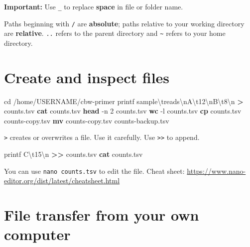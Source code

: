 \documentclass[
]{book}
\newenvironment{Shaded}{\begin{snugshade}}{\end{snugshade}}
\newcommand{\AttributeTok}[1]{\textcolor[rgb]{0.13,0.29,0.53}{#1}}
\newcommand{\BuiltInTok}[1]{#1}
\newcommand{\FunctionTok}[1]{\textcolor[rgb]{0.13,0.29,0.53}{\textbf{#1}}}
\newcommand{\NormalTok}[1]{#1}
\newcommand{\OperatorTok}[1]{\textcolor[rgb]{0.81,0.36,0.00}{\textbf{#1}}}
\newcommand{\StringTok}[1]{\textcolor[rgb]{0.31,0.60,0.02}{#1}}
\begin{document}
\textbf{Important:} Use \texttt{\_} to replace \textbf{space} in file or folder name.

Paths beginning with \texttt{/} are \textbf{absolute}; paths relative to your working directory are \textbf{relative}. \texttt{..} refers to the parent directory and \texttt{\textasciitilde{}} refers to your home directory.

\section{Create and inspect files}\label{create-and-inspect-files}

\begin{Shaded}
\begin{Highlighting}[]
\BuiltInTok{cd}\NormalTok{ /home/USERNAME/cbw{-}primer}
\BuiltInTok{printf} \StringTok{\textquotesingle{}sample\textbackslash{}treads\textbackslash{}nA\textbackslash{}t12\textbackslash{}nB\textbackslash{}t8\textbackslash{}n\textquotesingle{}} \OperatorTok{\textgreater{}}\NormalTok{ counts.tsv}
\FunctionTok{cat}\NormalTok{ counts.tsv}
\FunctionTok{head} \AttributeTok{{-}n}\NormalTok{ 2 counts.tsv}
\FunctionTok{wc} \AttributeTok{{-}l}\NormalTok{ counts.tsv}
\FunctionTok{cp}\NormalTok{ counts.tsv counts{-}copy.tsv}
\FunctionTok{mv}\NormalTok{ counts{-}copy.tsv counts{-}backup.tsv}
\end{Highlighting}
\end{Shaded}

\texttt{\textgreater{}} creates or overwrites a file. Use it carefully. Use \texttt{\textgreater{}\textgreater{}} to append.

\begin{Shaded}
\begin{Highlighting}[]
\BuiltInTok{printf} \StringTok{\textquotesingle{}C\textbackslash{}t15\textbackslash{}n\textquotesingle{}} \OperatorTok{\textgreater{}\textgreater{}}\NormalTok{ counts.tsv}
\FunctionTok{cat}\NormalTok{ counts.tsv}
\end{Highlighting}
\end{Shaded}

You can use \texttt{nano\ counts.tsv} to edit the file. Cheat sheet: \url{https://www.nano-editor.org/dist/latest/cheatsheet.html}

\section{File transfer from your own computer}\label{file-transfer-from-your-own-computer}
\end{document}

